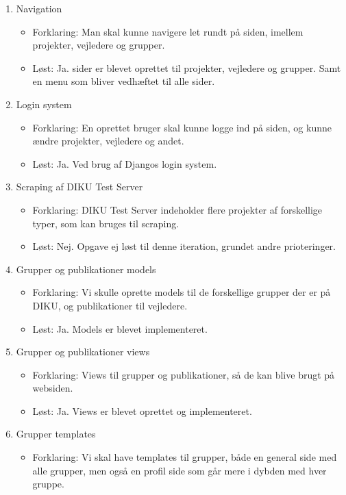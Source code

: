 \documentclass[11pt]{article}
\begin{document}
\begin{enumerate}
\item Navigation
	\begin{itemize}
	\item Forklaring: Man skal kunne navigere let rundt på siden, imellem projekter, vejledere og grupper.
        \item Løst: Ja. sider er blevet oprettet til projekter, vejledere og grupper. Samt en menu som bliver vedhæftet til alle sider.
	\end{itemize}
\item Login system
	\begin{itemize}
	\item Forklaring: En oprettet bruger skal kunne logge ind på siden, og kunne ændre projekter, vejledere og andet.
        \item Løst: Ja. Ved brug af Djangos login system.
	\end{itemize}
\item Scraping af DIKU Test Server
	\begin{itemize}
	\item Forklaring: DIKU Test Server indeholder flere projekter af forskellige typer, som kan bruges til scraping.
        \item Løst: Nej. Opgave ej løst til denne iteration, grundet andre prioteringer.
	\end{itemize}
\item Grupper og publikationer models
	\begin{itemize}
	\item Forklaring: Vi skulle oprette models til de forskellige grupper der er på DIKU, og publikationer til vejledere.
        \item Løst: Ja. Models er blevet implementeret.
	\end{itemize}
\item Grupper og publikationer views
	\begin{itemize}
	\item Forklaring: Views til grupper og publikationer, så de kan blive brugt på websiden.
        \item Løst: Ja. Views er blevet oprettet og implementeret.
	\end{itemize}
\item Grupper templates
	\begin{itemize}
	\item Forklaring: Vi skal have templates til grupper, både en general side med alle grupper, men også en profil side som går mere i dybden med hver gruppe.

\end{itemize}
\end{enumerate}
\end{document}
